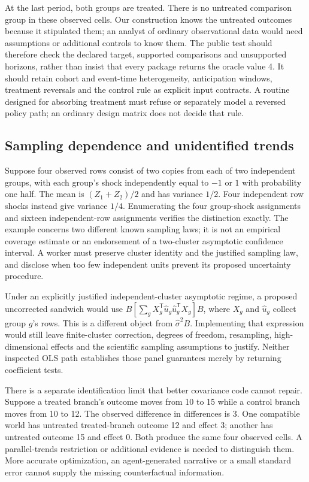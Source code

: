 At the last period, both groups are treated. There is no untreated comparison
group in these observed cells. Our construction knows the untreated outcomes
because it stipulated them; an analyst of ordinary observational data would
need assumptions or additional controls to know them. The public test should
therefore check the declared target, supported comparisons and unsupported
horizons, rather than insist that every package returns the oracle value 4.
It should retain cohort and event-time heterogeneity, anticipation windows,
treatment reversals and the control rule as explicit input contracts.
A routine designed for absorbing treatment must refuse or separately model
a reversed policy path; an ordinary design matrix does not decide that rule.
\citep{exec25_paneljava_reference}

\subsection{Sampling dependence and unidentified trends}
Suppose four observed rows consist of two copies from each of two independent
groups, with each group's shock independently equal to $-1$ or $1$ with
probability one half. The mean is $(Z_1+Z_2)/2$ and has variance $1/2$.
Four independent row shocks instead give variance $1/4$. Enumerating the
four group-shock assignments and sixteen independent-row assignments verifies
the distinction exactly. The example concerns two different known sampling
laws; it is not an empirical coverage estimate or an endorsement of a
two-cluster asymptotic confidence interval. A worker must preserve cluster
identity and the justified sampling law, and disclose when too few independent
units prevent its proposed uncertainty procedure.
\citep{exec25_paneljava_reference}

Under an explicitly justified independent-cluster asymptotic regime, a proposed
uncorrected sandwich would use $B[\sum_g X_g^\mathsf{T}\widehat u_g
\widehat u_g^\mathsf{T}X_g]B$, where $X_g$ and $\widehat u_g$ collect
group $g$'s rows. This is a different object from $\widehat\sigma^2B$.
Implementing that expression would still leave finite-cluster correction,
degrees of freedom, resampling, high-dimensional effects and the scientific
sampling assumptions to justify. Neither inspected OLS path establishes
those panel guarantees merely by returning coefficient tests.
\citep{exec25_paneljava_reference,exec25_paneljava_smile,exec25_paneljava_commons}

There is a separate identification limit that better covariance code cannot
repair. Suppose a treated branch's outcome moves from 10 to 15 while a control
branch moves from 10 to 12. The observed difference in differences is 3.
One compatible world has untreated treated-branch outcome 12 and effect 3;
another has untreated outcome 15 and effect 0. Both produce the same four
observed cells. A parallel-trends restriction or additional evidence is needed
to distinguish them. More accurate optimization, an agent-generated narrative
or a small standard error cannot supply the missing counterfactual information.
\citep{exec25_paneljava_reference}

